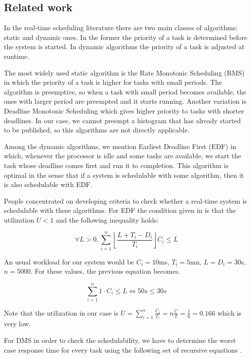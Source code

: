 \subsection*{Related work}

In the real-time scheduling literature there are two main classes of algorithms: static and dynamic ones. In the former the priority of a task is determined before the system is started. In dynamic algorithms the priority of a task is adjusted at runtime. 

The most widely used static algorithm is the Rate Monotonic Scheduling (RMS) \citep{liu1973scheduling} in which the priority of a task is higher for tasks with small periods. The algorithm is preemptive, so when a task with small period becomes available, the ones with larger period are preempted and it starts running. Another variation is Deadline Monotonic Scheduling which gives higher priority to tasks with shorter deadlines. In our case, we cannot preempt a histogram that has already started to be published, so this algorithms are not directly applicable. 

Among the dynamic algorithms, we mention Earliest Deadline First (EDF) \citep{liu1973scheduling} in which, whenever the processor is idle and some tasks are available, we start the task whose deadline comes first and run it to completion. This algorithm is optimal in the sense that if a system is schedulable with some algorithm, then it is also schedulable with EDF.

People concentrated on developing criteria to check whether a real-time system is schedulable with these algorithms. For EDF the condition given in \citep{baruah1990algorithms} is that the utilization $U < 1$ and the following inequality holds:

$$ \forall L > 0.\,  \sum_{i=1}^n \left\lfloor \frac{L+T_i-D_i}{T_i}\right\rfloor C_i \le L $$

An usual workload for our system would be $C_i=10$ms, $T_i=5$mn, $L=D_i=30$s, $n=5000$. For these values, the previous equation becomes.

$$ \sum_{i=1}^n 1 \cdot C_i \le L \Leftrightarrow 50s \le 30s $$

Note that the utilization in our case is $U=\sum_{i=1}^n\frac{C_i}{T_i}=n\frac C T = \frac 1 6 = 0.166$ which is very low. 

For DMS in order to check the schedulability, we have to determine the worst case response time for every task using the following set of recursive equations \citep{joseph1986finding}.

